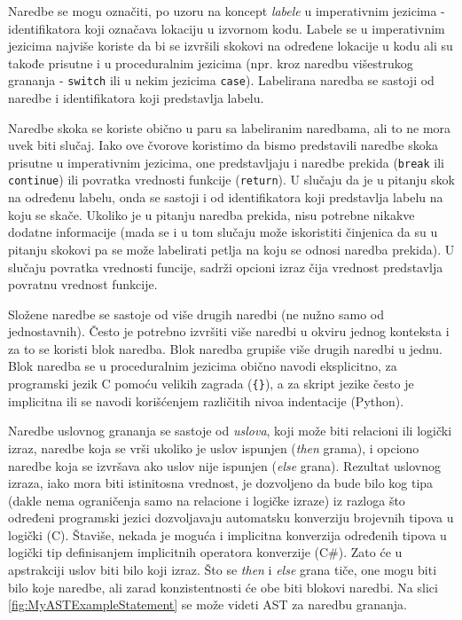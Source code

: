 Naredbe se mogu označiti, po uzoru na koncept \emph{labele} u imperativnim jezicima - identifikatora koji označava lokaciju u izvornom kodu. Labele se u imperativnim jezicima najviše koriste da bi se izvršili skokovi na određene lokacije u kodu ali su takođe prisutne i u proceduralnim jezicima (npr. kroz naredbu višestrukog grananja - \texttt{switch} ili u nekim jezicima \texttt{case}). Labelirana naredba se sastoji od naredbe i identifikatora koji predstavlja labelu. 

Naredbe skoka se koriste obično u paru sa labeliranim naredbama, ali to ne mora uvek biti slučaj. Iako ove čvorove koristimo da bismo predstavili naredbe skoka prisutne u imperativnim jezicima, one predstavljaju i naredbe prekida (\texttt{break} ili \texttt{continue}) ili povratka vrednosti funkcije (\texttt{return}). U slučaju da je u pitanju skok na određenu labelu, onda se sastoji i od identifikatora koji predstavlja labelu na koju se skače. Ukoliko je u pitanju naredba prekida, nisu potrebne nikakve dodatne informacije (mada se i u tom slučaju može iskoristiti činjenica da su u pitanju skokovi pa se može labelirati petlja na koju se odnosi naredba prekida). U slučaju povratka vrednosti funcije, sadrži opcioni izraz čija vrednost predstavlja povratnu vrednost funkcije.

Složene naredbe se sastoje od više drugih naredbi (ne nužno samo od jednostavnih). Često je potrebno izvršiti više naredbi u okviru jednog konteksta i za to se koristi blok naredba. Blok naredba grupiše više drugih naredbi u jednu. Blok naredba se u proceduralnim jezicima obično navodi eksplicitno, za programski jezik C pomoću velikih zagrada (\texttt{\{\}}), a za skript jezike često je implicitna ili se navodi korišćenjem različitih nivoa indentacije (Python).

Naredbe uslovnog grananja se sastoje od \emph{uslova}, koji može biti relacioni ili logički izraz, naredbe koja se vrši ukoliko je uslov ispunjen (\emph{then} grama), i opciono naredbe koja se izvršava ako uslov nije ispunjen (\emph{else} grana). Rezultat uslovnog izraza, iako mora biti istinitosna vrednost, je dozvoljeno da bude bilo kog tipa (dakle nema ograničenja samo na relacione i logičke izraze) iz razloga što određeni programski jezici dozvoljavaju automatsku konverziju brojevnih tipova u logički (C). Štaviše, nekada je moguća i implicitna konverzija određenih tipova u logički tip definisanjem implicitnih operatora konverzije (C\#). Zato će u apstrakciji uslov biti bilo koji izraz. Što se \emph{then} i \emph{else} grana tiče, one mogu biti bilo koje naredbe, ali zarad konzistentnosti će obe biti blokovi naredbi. Na slici \ref{fig:MyASTExampleStatement} se može videti AST za naredbu grananja.

